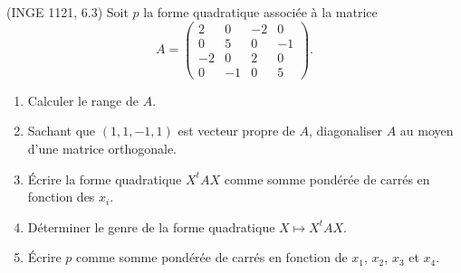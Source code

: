 

\begin{exercice}\label{exoINGE1121La0017}

	(INGE 1121, 6.3) Soit $p$ la forme quadratique associée à la matrice
	\begin{equation}
		A=\begin{pmatrix}
			 2	&	0	&	-2	&	0	\\
			 0	&	5	&	0	&	-1	\\
			 -2	&	0	&	2	&	0	\\ 
			 0	&	-1	&	0	&	5	 
		 \end{pmatrix}.
	\end{equation}
	\begin{enumerate}

		\item
			Calculer le range de $A$.
		\item
			Sachant que $(1,1,-1,1)$ est vecteur propre de $A$, diagonaliser $A$ au moyen d'une matrice orthogonale.

		\item
			Écrire la forme quadratique $X^tAX$ comme somme pondérée de carrés en fonction des $x_i$.
		\item
			Déterminer le genre de la forme quadratique $X\mapsto X^tAX$.
		\item
			Écrire $p$ comme somme pondérée de carrés en fonction de $x_1$, $x_2$, $x_3$ et $x_4$.

	\end{enumerate}

\end{exercice}
